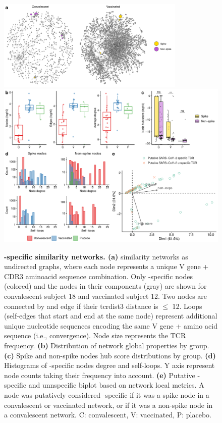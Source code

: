 \begin{figure}[!t]
	\centering
	\includegraphics[width=0.8\textwidth,keepaspectratio]{figures/two_nets.png}
	\includegraphics[width=\textwidth,keepaspectratio]{figures/fig4.pdf}
	\caption{\textbf{\covid-specific \TCRB{} similarity networks. (a)} \TCRB{} similarity networks as undirected graphs, where each node represents a unique V gene + CDR3 aminoacid sequence combination. Only \covid-specific nodes (colored) and the nodes in their components (gray) are shown for convalescent subject 18 and vaccinated subject 12. Two nodes are connected by and edge if their tcrdist3 distance is $\leq$ 12. Loops (self-edges that start and end at the same node) represent additional unique nucleotide sequences encoding the same V gene + amino acid sequence (i.e., convergence). Node size represents the TCR frequency. \textbf{(b)} Distribution of network global properties by group. \textbf{(c)} Spike and non-spike nodes hub score distributions by group. \textbf{(d)} Histograms of \covid-specific nodes degree and self-loops. Y axis represent node counts taking their frequency into account. \textbf{(e)} Putative \covid-specific and unnspecific biplot based on network local metrics. A node was putatively considered \covid-specific if it was a spike node in a convalescent or vaccinated network, or if it was a non-spike node in a convalescent network.  C: convalescent, V: vaccinated, P: placebo.}
	\label{fig:nets}
\end{figure}


